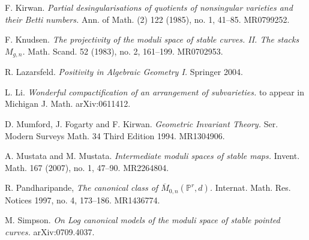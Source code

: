 \documentclass[10pt]{amsart}
\theoremstyle{definition}
\newcommand{\PP}{\mathbb{P}}
\begin{document}
\begin{thebibliography}{10}
 F. Kirwan. {\em Partial desingularisations of quotients
of nonsingular varieties and their Betti numbers.}
Ann. of Math. (2)  122  (1985),  no. 1, 41--85. MR0799252.

 F. Knudsen. {\em The projectivity of the moduli space
of stable curves. II. The stacks $M_{g,n}$.} Math. Scand.  52
(1983),  no. 2, 161--199. MR0702953.

 R. Lazarsfeld. {\em Positivity in Algebraic
Geometry I.} Springer 2004.

 L. Li. {\em Wonderful compactification of an arrangement of subvarieties.}
to appear in Michigan J. Math.  arXiv:0611412.


 D. Mumford, J. Fogarty and F. Kirwan. {\em Geometric
Invariant Theory.} Ser. Modern Surveys Math. 34 Third Edition
1994. MR1304906.

 A. Mustata and M. Mustata. {\em Intermediate moduli spaces
of stable maps.} Invent. Math. 167 (2007), no. 1, 47--90.
MR2264804.

 R. Pandharipande, {\em The canonical class of
$\overline{M}_{0,n}(\PP^r, d)$.}  Internat. Math. Res. Notices  1997,
no. 4, 173--186. MR1436774.

 M. Simpson. {\em On Log canonical models of
the moduli space of stable pointed curves.} arXiv:0709.4037.

\end{thebibliography}
\end{document}
